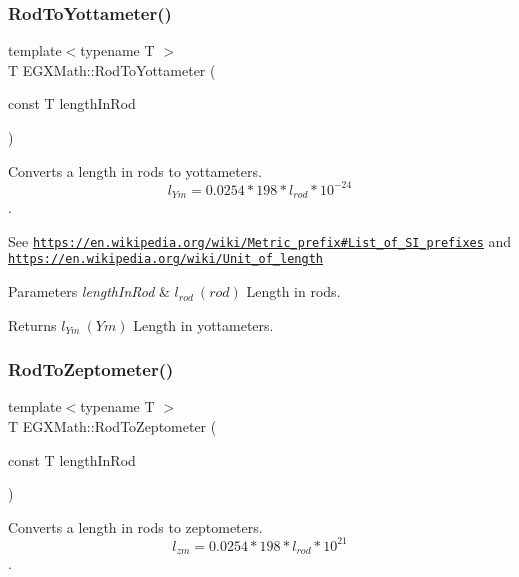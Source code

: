 \subsubsection{\texorpdfstring{Rod\+To\+Yottameter()}{RodToYottameter()}}
{\footnotesize\ttfamily template$<$typename T $>$ \\
T E\+G\+X\+Math\+::\+Rod\+To\+Yottameter (\begin{DoxyParamCaption}\item[{const T}]{length\+In\+Rod }\end{DoxyParamCaption})}



Converts a length in rods to yottameters. \[ l_{Ym}=0.0254 * 198 * l_{rod} * 10^{-24} \]. 

See \href{https://en.wikipedia.org/wiki/Metric_prefix#List_of_SI_prefixes}{\tt https\+://en.\+wikipedia.\+org/wiki/\+Metric\+\_\+prefix\#\+List\+\_\+of\+\_\+\+S\+I\+\_\+prefixes} and \href{https://en.wikipedia.org/wiki/Unit_of_length}{\tt https\+://en.\+wikipedia.\+org/wiki/\+Unit\+\_\+of\+\_\+length} 
\begin{DoxyParams}{Parameters}
{\em length\+In\+Rod} & $ l_{rod}\ (rod)$ Length in rods. \\
\hline
\end{DoxyParams}
\begin{DoxyReturn}{Returns}
$ l_{Ym}\ (Ym)$ Length in yottameters. 
\end{DoxyReturn}
\mbox{\label{group___e_g_x_math-_conversions-_length_conversions-_surveyors-_rod-_s_i_gae5ab77b04e6ee5bfdce5aaa3917b92a5}} 
\subsubsection{\texorpdfstring{Rod\+To\+Zeptometer()}{RodToZeptometer()}}
{\footnotesize\ttfamily template$<$typename T $>$ \\
T E\+G\+X\+Math\+::\+Rod\+To\+Zeptometer (\begin{DoxyParamCaption}\item[{const T}]{length\+In\+Rod }\end{DoxyParamCaption})}



Converts a length in rods to zeptometers. \[ l_{zm}=0.0254 * 198 * l_{rod} * 10^{21} \]. 

